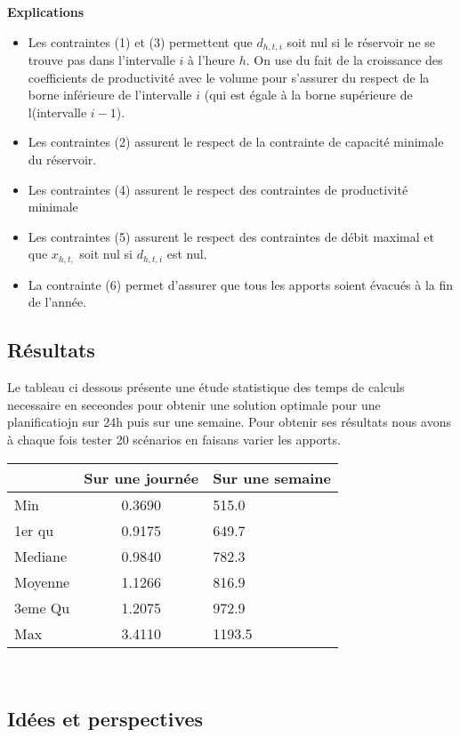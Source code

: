 \documentclass[a4paper]{report}
\begin{document}
\textbf{Explications}
\begin{itemize}
\item Les contraintes (1) et (3) permettent que $d_{h,t,i}$ soit nul si le réservoir ne se trouve pas dans l'intervalle $i$ à l'heure $h$. On use du fait de la croissance des coefficients de productivité
avec le volume pour s'assurer du respect de la borne inférieure de l'intervalle $i$ (qui est égale à la borne supérieure de l(intervalle $i-1$).
\item Les contraintes (2) assurent le respect de la contrainte de capacité minimale du réservoir.
\item Les contraintes (4) assurent le respect des contraintes de productivité minimale
\item Les contraintes (5) assurent le respect des contraintes de débit maximal et que $x_{h,t,}$ soit nul si $d_{h,t,i}$ est nul. 
\item La contrainte (6) permet d'assurer que tous les apports soient évacués à la fin de l'année.

\end{itemize}

\subsection{Résultats}
Le tableau ci dessous présente une étude statistique des temps de calculs necessaire en seceondes pour obtenir une solution optimale pour une planificatiojn sur 24h puis sur une semaine. Pour obtenir ses résultats nous avons à chaque fois tester 20 scénarios en faisans varier les apports.\\
\begin{tabular}{|l|c|l|}
  \hline
  &Sur une journée&Sur une semaine\\
  \hline
  Min &0.3690 &515.0\\
  \hline
  1er qu & 0.9175&649.7  
\\
  \hline
  Mediane & 0.9840&782.3  
\\
  \hline
  Moyenne &1.1266 & 816.9  
\\
  \hline
  3eme Qu &1.2075&972.9\\
  \hline
  Max & 3.4110 &1193.5\\

 
  \hline
\end{tabular}
\\
\subsection{Idées et perspectives}
\end{document}
